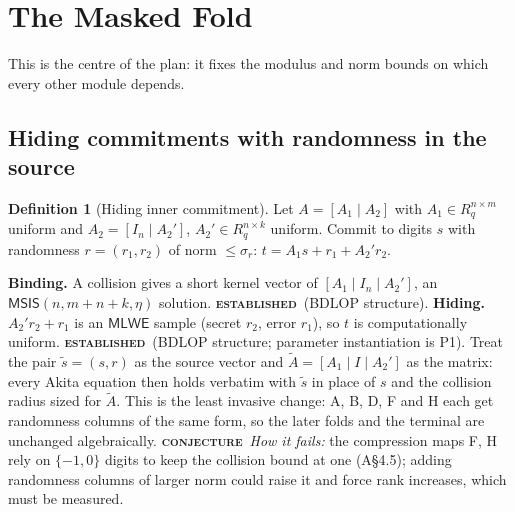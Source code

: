 \documentclass[11pt]{article}
\newcommand{\epitag}[3]{\colorbox{#2}{\textcolor{#1}{\textsc{\footnotesize\bfseries #3}}}}
\newcommand{\established}{\epitag{estgreen}{estbg}{established}}
\newcommand{\conjectureTag}{\epitag{conjyellow}{conjbg}{conjecture}}
\renewcommand{\_}{\textunderscore\allowbreak{}}
\theoremstyle{definition}
\newtheorem{definition}{Definition}
\begin{document}
\section{The Masked Fold}
\label{sec:fold}
This is the centre of the plan: it fixes the modulus and norm bounds on which every other module depends.

\subsection{Hiding commitments with randomness in the source}
\begin{definition}[Hiding inner commitment]
Let $A=[A_1\mid A_2]$ with $A_1\in R_q^{n\times m}$ uniform and $A_2=[I_n\mid A_2']$, $A_2'\in R_q^{n\times k}$ uniform. Commit to digits $s$ with randomness $r=(r_1,r_2)$ of norm $\le\sigma_r$:
$t = A_1 s + r_1 + A_2' r_2$.
\end{definition}
\textbf{Binding.} A collision gives a short kernel vector of $[A_1\mid I_n\mid A_2']$, an $\mathsf{MSIS}(n,m+n+k,\eta)$ solution. \established\ (BDLOP structure).
\textbf{Hiding.} $A_2' r_2+r_1$ is an $\mathsf{MLWE}$ sample (secret $r_2$, error $r_1$), so $t$ is computationally uniform. \established\ (BDLOP structure; parameter instantiation is P1).
Treat the pair $\tilde s=(s,r)$ as the source vector and $\tilde A=[A_1\mid I\mid A_2']$ as the matrix: every Akita equation then holds verbatim with $\tilde s$ in place of $s$ and the collision radius sized for $\tilde A$. This is the least invasive change: A, B, D, F and H each get randomness columns of the same form, so the later folds and the terminal are unchanged algebraically. \conjectureTag\ \textit{How it fails:} the compression maps F, H rely on $\{-1,0\}$ digits to keep the collision bound at one (A\S4.5); adding randomness columns of larger norm could raise it and force rank increases, which must be measured.
\end{document}
